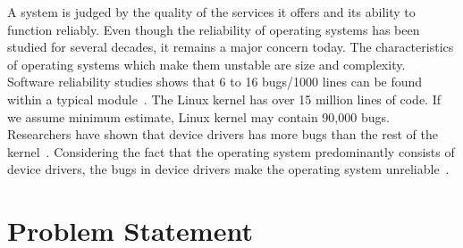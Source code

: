 A system is judged by the quality of the services it offers and its ability to function reliably. Even though the reliability of operating systems has been studied for several decades, it remains a major concern today. The characteristics of operating systems which make them unstable are size and complexity. 
\\
Software reliability studies shows that 6 to 16 bugs/1000 lines can be found within a typical module~\cite{Basili:1984:SEC:69605.2085}. The Linux kernel has over 15 million lines of code. If we assume minimum estimate, Linux kernel may contain 90,000 bugs. Researchers have shown that device drivers has more bugs than the rest of the kernel~\cite{Chou:2001:ESO:502034.502042}. Considering the fact that the operating system predominantly consists of device drivers, the bugs in device drivers make the operating system unreliable~\cite{Chou:2001:ESO:502034.502042}.

\pagebreak

\section {Problem Statement}

